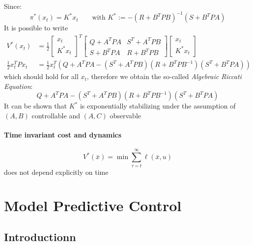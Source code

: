 \documentclass[openany]{book}
\theoremstyle{definition}
\theoremstyle{remark}
\begin{document}
Since: 
\[
    \pi^*(x_t) = K^*x_t \qquad \text{with } K^* := -(R+B^TPB)^{-1}(S + B^TPA)
\]
It is possible to write 
\begin{align*}
    V^*(x_t) &= \frac{1}{2} \begin{bmatrix}
        x_t \\ K^* x_t
    \end{bmatrix}^T \begin{bmatrix}
        Q+A^T P A & S^T + A^T P B\\ 
        S + B^T P A & R + B^T P B
    \end{bmatrix} \begin{bmatrix}
        x_t \\ K^* x_t
    \end{bmatrix} \\
    \displaystyle\frac{1}{2}x_t^TPx_t&= \displaystyle\frac{1}{2}x_t^T\left(Q +A^TPA-(S^T+A^TPB)(R+B^TPB^{-1})(S^T+B^TPA)\right)
\end{align*}
which should hold for all $x_t$, therefore we obtain the so-called \emph{Algebraic Riccati Equation}:
\[
    Q +A^TPA-(S^T+A^TPB)(R+B^TPB^{-1})(S^T+B^TPA)
\]
It can be shown that $K^*$ is exponentially stabilizing under the assumption of $(A,B)$ controllable and $(A,C)$ observable

\subsubsection{Time invariant cost and dynamics} %

\[
    V^*(\bar{x})= \min \displaystyle\sum_{\tau=t}^{\infty}\ell(\bar{x},u)
\]
does not depend explicitly on time






















\chapter{Model Predictive Control}
\section{Introductionn}
\end{document}
